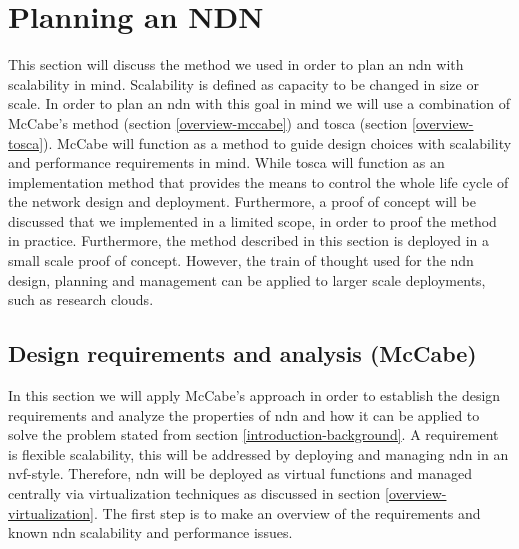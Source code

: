 \section{Planning an NDN}
\label{planning-ndn}
This section will discuss the method we used in order to plan an \gls{ndn} with scalability in mind. Scalability is defined as capacity to be changed in size or scale. In order to plan an \gls{ndn} with this goal in mind we will use a combination of McCabe's method (section \ref{overview-mccabe}) and \gls{tosca} (section \ref{overview-tosca}). McCabe will function as a method to guide design choices with scalability and performance requirements in mind. While \gls{tosca} will function as an implementation method that provides the means to control the whole life cycle of the network design and deployment. Furthermore, a proof of concept will be discussed that we implemented in a limited scope, in order to proof the method in practice. Furthermore, the method described in this section is deployed in a small scale proof of concept. However, the train of thought used for the \gls{ndn} design, planning and management can be applied to larger scale deployments, such as research clouds.

\subsection{Design requirements and analysis (McCabe)}
\label{planning-requirements}
In this section we will apply McCabe's approach in order to establish the design requirements and analyze the properties of \gls{ndn} and how it can be applied to solve the problem stated from section \ref{introduction-background}. A requirement is flexible scalability, this will be addressed by deploying and managing \gls{ndn} in an \gls{nvf}-style. Therefore, \gls{ndn} will be deployed as virtual functions and managed centrally via virtualization techniques as discussed in section \ref{overview-virtualization}. The first step is to make an overview of the requirements and known \gls{ndn} scalability and performance issues.

